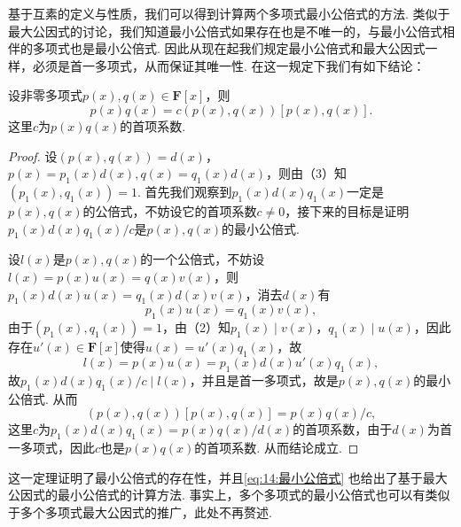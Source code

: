 基于互素的定义与性质，我们可以得到计算两个多项式最小公倍式的方法. 类似于最大公因式的讨论，我们知道最小公倍式如果存在也是不唯一的，与最小公倍式相伴的多项式也是最小公倍式. 因此从现在起我们规定最小公倍式和最大公因式一样，必须是首一多项式，从而保证其唯一性. 在这一规定下我们有如下结论：
\begin{theorem}{}{}
    设非零多项式$p(x),q(x)\in\mathbf{F}[x]$，则
    \begin{equation} \label{eq:14:最小公倍式}
        p(x)q(x)=c(p(x),q(x))[p(x),q(x)].
    \end{equation}
    这里$c$为$p(x)q(x)$的首项系数.
\end{theorem}
\begin{proof}
    设$(p(x),q(x))=d(x)$，$p(x)=p_1(x)d(x),q(x)=q_1(x)d(x)$，则由（3）知$(p_1(x),q_1(x))=1$. 首先我们观察到$p_1(x)d(x)q_1(x)$一定是$p(x),q(x)$的公倍式，不妨设它的首项系数$c\neq 0$，接下来的目标是证明$p_1(x)d(x)q_1(x)/c$是$p(x),q(x)$的最小公倍式.

    设$l(x)$是$p(x),q(x)$的一个公倍式，不妨设$l(x)=p(x)u(x)=q(x)v(x)$，则$p_1(x)d(x)u(x)=q_1(x)d(x)v(x)$，消去$d(x)$有
    \[p_1(x)u(x)=q_1(x)v(x),\]
    由于$(p_1(x),q_1(x))=1$，由（2）知$p_1(x)\mid v(x)$，$q_1(x)\mid u(x)$，因此存在$u'(x)\in\mathbf{F}[x]$使得$u(x)=u'(x)q_1(x)$，故
    \[l(x)=p(x)u(x)=p_1(x)d(x)u'(x)q_1(x),\]
    故$p_1(x)d(x)q_1(x)/c\mid l(x)$，并且是首一多项式，故是$p(x),q(x)$的最小公倍式. 从而
    \[(p(x),q(x))[p(x),q(x)]=p(x)q(x)/c,\]
    这里$c$为$p_1(x)d(x)q_1(x)=p(x)q(x)/d(x)$的首项系数，由于$d(x)$为首一多项式，因此$c$也是$p(x)q(x)$的首项系数. 从而结论成立.
\end{proof}

这一定理证明了最小公倍式的存在性，并且\autoref{eq:14:最小公倍式} 也给出了基于最大公因式的最小公倍式的计算方法. 事实上，多个多项式的最小公倍式也可以有类似于多个多项式最大公因式的推广，此处不再赘述.

